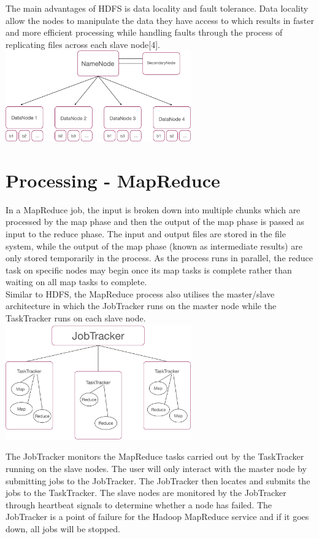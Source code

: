 \documentclass[11pt]{book}
\begin{document}
The main advantages of HDFS is data locality and fault tolerance. Data locality allow the nodes to manipulate the data they have access to which results in faster and more efficient processing while handling faults through the process of replicating files across each slave node[4].\\

\includegraphics[width=8cm]{hdfs}

\section{Processing - MapReduce}

In a MapReduce job, the input is broken down into multiple chunks which are processed by the map phase and then the output of the map phase is passed as input to the reduce phase. The input and output files are stored in the file system, while the output of the map phase (known as intermediate results) are only stored temporarily in the process. As the process runs in parallel, the reduce task on specific nodes may begin once its map tasks is complete rather than waiting on all map tasks to complete.\\

Similar to HDFS, the MapReduce process also utilises the master/slave architecture in which the JobTracker runs on the master node while the TaskTracker runs on each slave node. \\

\includegraphics[width=8cm]{jobtracker}

The JobTracker monitors the MapReduce tasks carried out by the TaskTracker running on the slave nodes. The user will only interact with the master node by submitting jobs to the JobTracker. The JobTracker then locates and submits the jobs to the TaskTracker. The slave nodes are monitored by the JobTracker through heartbeat signals to determine whether a node has failed. The JobTracker is a point of failure for the Hadoop MapReduce service and if it goes down, all jobs will be stopped. \\
\end{document}
